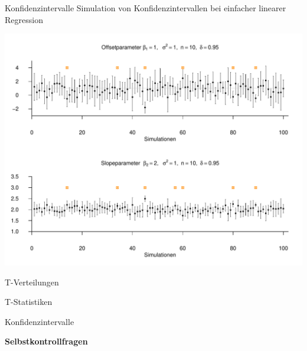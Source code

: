 \documentclass[
  8pt,
  ignorenonframetext,
]{beamer}
\begin{document}
\begin{frame}{Konfidenzintervalle}
\protect\hypertarget{konfidenzintervalle-5}{}
Simulation von Konfidenzintervallen bei einfacher linearer Regression

\begin{center}\includegraphics[width=0.9\linewidth]{7_Abbildungen/alm_7_elr_konfidenzintervalle} \end{center}
\end{frame}

\begin{frame}{}
\protect\hypertarget{section-12}{}
\vfill
\large
{}

T-Verteilungen

T-Statistiken

Konfidenzintervalle

\textbf{Selbstkontrollfragen} \vfill
\end{frame}
\end{document}
